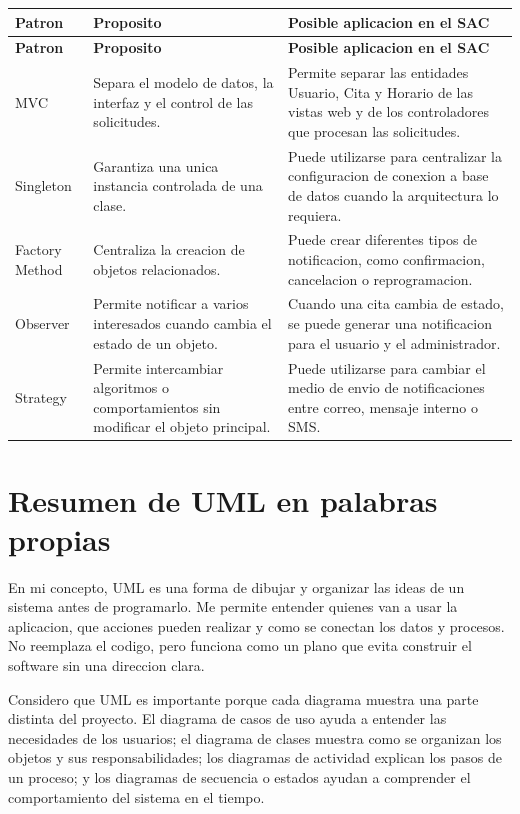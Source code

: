 \documentclass[12pt,letterpaper]{article}
\begin{document}
\begin{longtable}{|p{3.5cm}|p{4.6cm}|p{6.8cm}|}
\hline
\textbf{Patron} & \textbf{Proposito} & \textbf{Posible aplicacion en el SAC} \\
\hline
\endfirsthead
\hline
\textbf{Patron} & \textbf{Proposito} & \textbf{Posible aplicacion en el SAC} \\
\hline
\endhead
\hline
\endfoot
\hline
\endlastfoot

MVC & Separa el modelo de datos, la interfaz y el control de las solicitudes. & Permite separar las entidades Usuario, Cita y Horario de las vistas web y de los controladores que procesan las solicitudes. \\
\hline

Singleton & Garantiza una unica instancia controlada de una clase. & Puede utilizarse para centralizar la configuracion de conexion a base de datos cuando la arquitectura lo requiera. \\
\hline

Factory Method & Centraliza la creacion de objetos relacionados. & Puede crear diferentes tipos de notificacion, como confirmacion, cancelacion o reprogramacion. \\
\hline

Observer & Permite notificar a varios interesados cuando cambia el estado de un objeto. & Cuando una cita cambia de estado, se puede generar una notificacion para el usuario y el administrador. \\
\hline

Strategy & Permite intercambiar algoritmos o comportamientos sin modificar el objeto principal. & Puede utilizarse para cambiar el medio de envio de notificaciones entre correo, mensaje interno o SMS. \\
\hline
\end{longtable}

\section{Resumen de UML en palabras propias}

En mi concepto, UML es una forma de dibujar y organizar las ideas de un sistema antes de programarlo. Me permite entender quienes van a usar la aplicacion, que acciones pueden realizar y como se conectan los datos y procesos. No reemplaza el codigo, pero funciona como un plano que evita construir el software sin una direccion clara.

Considero que UML es importante porque cada diagrama muestra una parte distinta del proyecto. El diagrama de casos de uso ayuda a entender las necesidades de los usuarios; el diagrama de clases muestra como se organizan los objetos y sus responsabilidades; los diagramas de actividad explican los pasos de un proceso; y los diagramas de secuencia o estados ayudan a comprender el comportamiento del sistema en el tiempo.
\end{document}
